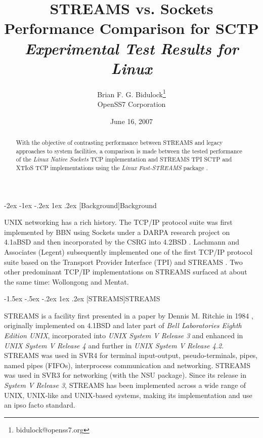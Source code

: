 \documentclass[letterpaper,final,notitlepage,twocolumn,10pt,twoside]{article}
\makeatletter
\let\large = \normalsize
\let\normalsize = \small
\let\small = \footnotesize
\let\footnotesize = \scriptsize
\let\scriptsize = \tiny
\renewcommand\section{\@startsection {section}{1}{\z@}%
                                   {-2ex \@plus -1ex \@minus -.2ex}%
                                   {1ex \@plus .2ex}%
                                   {\normalfont\large\bfseries}}
\renewcommand\subsection{\@startsection{subsection}{2}{\z@}%
                                     {-1.5ex \@plus -.5ex \@minus -.2ex}%
                                     {1ex \@plus .2ex}%
                                     {\normalfont\normalsize\bfseries}}
\makeatother
\begin{document}

\title{STREAMS vs. Sockets Performance Comparison for SCTP\\[0.5ex]
	{\large \textsl{Experimental Test Results for Linux}}}
\author{Brian F. G. Bidulock\thanks{bidulock@openss7.org}\\
	OpenSS7 Corporation}
\date{June 16, 2007}
\maketitle

\begin{abstract}
With the objective of contrasting performance between STREAMS and legacy approaches to system
facilities, a comparison is made between the tested performance of the \textsl{Linux Native Sockets} TCP
implementation and STREAMS TPI SCTP and XTIoS TCP
implementations using the \textsl{Linux Fast-STREAMS} package \cite[]{LfS}.
\end{abstract}


\section[Background]{Background}

UNIX networking has a rich history.  The TCP/IP protocol suite was first implemented by BBN using
Sockets under a DARPA research project on 4.1aBSD and then incorporated by the CSRG into 4.2BSD
\cite[]{bsd}.  Lachmann and Associates (Legent) subsequently implemented one of the first TCP/IP
protocol suite based on the Transport Provider Interface (TPI) \cite[]{tli} and STREAMS
\cite[]{magic}.  Two other predominant TCP/IP implementations on STREAMS surfaced at about the same
time: Wollongong and Mentat.

\subsection[STREAMS]{STREAMS}

STREAMS is a facility first presented in a paper by Dennis M. Ritchie in 1984 \cite[]{Ritchie84},
originally implemented on 4.1BSD and later part of \textsl{Bell Laboratories Eighth Edition UNIX},
incorporated into \textsl{UNIX System V Release 3} and enhanced in \textsl{UNIX System V Release 4}
and further in \textsl{UNIX System V Release 4.2}.  STREAMS was used in SVR4 for terminal
input-output, pseudo-terminals, pipes, named pipes (FIFOs), interprocess communication and
networking.  STREAMS was used in SVR3 for networking (with the NSU package).  Since its release in
\textsl{System V Release 3}, STREAMS has been implemented across a wide range of UNIX, UNIX-like and
UNIX-based systems, making its implementation and use an ipso facto standard.
\end{document}
